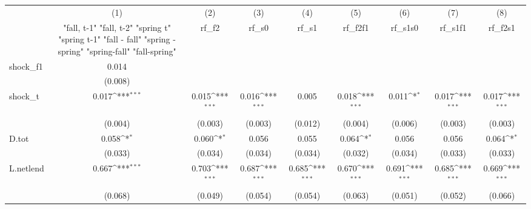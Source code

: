 {
\def\sym#1{\ifmmode^{#1}\else\(^{#1}\)\fi}
\begin{tabular}{l*{8}{c}}
\toprule
            &\multicolumn{1}{c}{(1)}&\multicolumn{1}{c}{(2)}&\multicolumn{1}{c}{(3)}&\multicolumn{1}{c}{(4)}&\multicolumn{1}{c}{(5)}&\multicolumn{1}{c}{(6)}&\multicolumn{1}{c}{(7)}&\multicolumn{1}{c}{(8)}\\
            &\multicolumn{1}{c}{  "fall, t-1" "fall, t-2" "spring t" "spring t-1"  "fall - fall" "spring - spring" "spring-fall" "fall-spring" }&\multicolumn{1}{c}{rf\_f2}&\multicolumn{1}{c}{rf\_s0}&\multicolumn{1}{c}{rf\_s1}&\multicolumn{1}{c}{rf\_f2f1}&\multicolumn{1}{c}{rf\_s1s0}&\multicolumn{1}{c}{rf\_s1f1}&\multicolumn{1}{c}{rf\_f2s1}\\
\midrule
shock\_f1    &       0.014         &                     &                     &                     &                     &                     &                     &                     \\
            &     (0.008)         &                     &                     &                     &                     &                     &                     &                     \\
\addlinespace
shock\_t     &       0.017\sym{***}&       0.015\sym{***}&       0.016\sym{***}&       0.005         &       0.018\sym{***}&       0.011\sym{*}  &       0.017\sym{***}&       0.017\sym{***}\\
            &     (0.004)         &     (0.003)         &     (0.003)         &     (0.012)         &     (0.004)         &     (0.006)         &     (0.003)         &     (0.003)         \\
\addlinespace
D.tot       &       0.058\sym{*}  &       0.060\sym{*}  &       0.056         &       0.055         &       0.064\sym{*}  &       0.056         &       0.056         &       0.064\sym{*}  \\
            &     (0.033)         &     (0.034)         &     (0.034)         &     (0.034)         &     (0.032)         &     (0.034)         &     (0.033)         &     (0.033)         \\
\addlinespace
L.netlend   &       0.667\sym{***}&       0.703\sym{***}&       0.687\sym{***}&       0.685\sym{***}&       0.670\sym{***}&       0.691\sym{***}&       0.685\sym{***}&       0.669\sym{***}\\
            &     (0.068)         &     (0.049)         &     (0.054)         &     (0.054)         &     (0.063)         &     (0.051)         &     (0.052)         &     (0.066)         \\

\end{tabular}}
